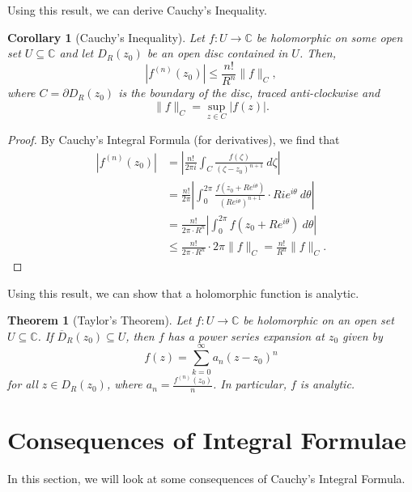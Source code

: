 \documentclass[a4paper, openany]{memoir}
\theoremstyle{definition}
\theoremstyle{plain}
\newtheorem{theorem}[definition]{Theorem}
\newtheorem{corollary}[definition]{Corollary}
\begin{document}
    Using this result, we can derive Cauchy's Inequality.
    \begin{corollary}[Cauchy's Inequality]
        Let $f \colon U \to \mathbb{C}$ be holomorphic on some open set $U \subseteq \mathbb{C}$ and let $D_R(z_0)$ be an open disc contained in $U$. Then,
        \[|f^{(n)} (z_0)| \leq \frac{n!}{R^n} \lVert f \rVert_C,\]
        where $C = \partial D_R(z_0)$ is the boundary of the disc, traced anti-clockwise and
        \[\lVert f \rVert_C = \sup_{z \in C} |f(z)|.\]
    \end{corollary}
    \begin{proof}
        By Cauchy's Integral Formula (for derivatives), we find that
        \begin{align*}
            |f^{(n)}(z_0)| &= \left|\frac{n!}{2\pi i} \int_C \frac{f(\zeta)}{(\zeta - z_0)^{n+1}} \ d\zeta \right| \\
            &= \frac{n!}{2\pi} \left|\int_0^{2\pi} \frac{f(z_0 + Re^{i\theta})}{(Re^{i\theta})^{n+1}}\cdot Ri e^{i\theta} \ d\theta \right| \\
            &= \frac{n!}{2\pi \cdot R^n} \left| \int_0^{2\pi} f(z_0 + Re^{i\theta}) \ d\theta \right| \\
            &\leq \frac{n!}{2\pi \cdot R^n}  \cdot 2\pi \lVert f \rVert_C = \frac{n!}{R^n} \lVert f \rVert_C.
        \end{align*}
    \end{proof}
    Using this result, we can show that a holomorphic function is analytic.
    \begin{theorem}[Taylor's Theorem]
        Let $f \colon U \to \mathbb{C}$ be holomorphic on an open set $U \subseteq \mathbb{C}$. If $\overline{D}_R(z_0) \subseteq U$, then $f$ has a power series expansion at $z_0$ given by
        \[f(z) = \sum_{k=0}^\infty a_n(z - z_0)^n\]
        for all $z \in D_R(z_0)$, where $a_n = \frac{f^{(n)}(z_0)}{n}$. In particular, $f$ is analytic.
    \end{theorem}
    \newpage

    \section{Consequences of Integral Formulae}
    In this section, we will look at some consequences of Cauchy's Integral Formula.
\end{document}
